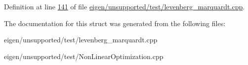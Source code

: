 Definition at line \hyperlink{eigen_2unsupported_2test_2levenberg__marquardt_8cpp_source_l00141}{141} of file \hyperlink{eigen_2unsupported_2test_2levenberg__marquardt_8cpp_source}{eigen/unsupported/test/levenberg\+\_\+marquardt.\+cpp}.



The documentation for this struct was generated from the following files\+:\begin{DoxyCompactItemize}
\item 
eigen/unsupported/test/levenberg\+\_\+marquardt.\+cpp\item 
eigen/unsupported/test/\+Non\+Linear\+Optimization.\+cpp\end{DoxyCompactItemize}
